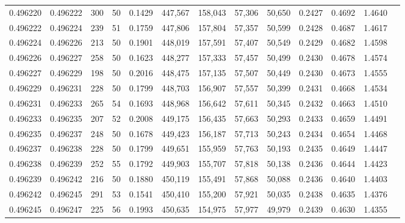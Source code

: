 \begin{tabular}{rrrrrrrrrrrrr}
0.496220 & 0.496222 &   300 &  50 &                                     0.1429 & 447,567 & 158,043 &  57,306 &  50,650 & 0.2427 & 0.4692 & 1.4640 \\
0.496222 & 0.496224 &   239 &  51 &                                     0.1759 & 447,806 & 157,804 &  57,357 &  50,599 & 0.2428 & 0.4687 & 1.4617 \\
0.496224 & 0.496226 &   213 &  50 &                                     0.1901 & 448,019 & 157,591 &  57,407 &  50,549 & 0.2429 & 0.4682 & 1.4598 \\
0.496226 & 0.496227 &   258 &  50 &                                     0.1623 & 448,277 & 157,333 &  57,457 &  50,499 & 0.2430 & 0.4678 & 1.4574 \\
0.496227 & 0.496229 &   198 &  50 &                                     0.2016 & 448,475 & 157,135 &  57,507 &  50,449 & 0.2430 & 0.4673 & 1.4555 \\
0.496229 & 0.496231 &   228 &  50 &                                     0.1799 & 448,703 & 156,907 &  57,557 &  50,399 & 0.2431 & 0.4668 & 1.4534 \\
0.496231 & 0.496233 &   265 &  54 &                                     0.1693 & 448,968 & 156,642 &  57,611 &  50,345 & 0.2432 & 0.4663 & 1.4510 \\
0.496233 & 0.496235 &   207 &  52 &                                     0.2008 & 449,175 & 156,435 &  57,663 &  50,293 & 0.2433 & 0.4659 & 1.4491 \\
0.496235 & 0.496237 &   248 &  50 &                                     0.1678 & 449,423 & 156,187 &  57,713 &  50,243 & 0.2434 & 0.4654 & 1.4468 \\
0.496237 & 0.496238 &   228 &  50 &                                     0.1799 & 449,651 & 155,959 &  57,763 &  50,193 & 0.2435 & 0.4649 & 1.4447 \\
0.496238 & 0.496239 &   252 &  55 &                                     0.1792 & 449,903 & 155,707 &  57,818 &  50,138 & 0.2436 & 0.4644 & 1.4423 \\
0.496239 & 0.496242 &   216 &  50 &                                     0.1880 & 450,119 & 155,491 &  57,868 &  50,088 & 0.2436 & 0.4640 & 1.4403 \\
0.496242 & 0.496245 &   291 &  53 &                                     0.1541 & 450,410 & 155,200 &  57,921 &  50,035 & 0.2438 & 0.4635 & 1.4376 \\
0.496245 & 0.496247 &   225 &  56 &                                     0.1993 & 450,635 & 154,975 &  57,977 &  49,979 & 0.2439 & 0.4630 & 1.4355 \\

\end{tabular}
